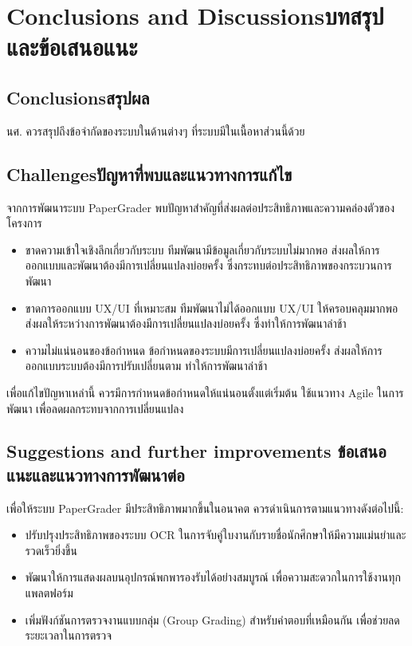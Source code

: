 \chapter{\ifenglish Conclusions and Discussions\else บทสรุปและข้อเสนอแนะ\fi}

\section{\ifenglish Conclusions\else สรุปผล\fi}

นศ. ควรสรุปถึงข้อจำกัดของระบบในด้านต่างๆ ที่ระบบมีในเนื้อหาส่วนนี้ด้วย

\section{\ifenglish Challenges\else ปัญหาที่พบและแนวทางการแก้ไข\fi}

จากการพัฒนาระบบ PaperGrader พบปัญหาสําคัญที่ส่งผลต่อประสิทธิภาพและความคล่องตัวของโครงการ
\begin{itemize}
  \item ขาดความเข้าใจเชิงลึกเกี่ยวกับระบบ ทีมพัฒนามีข้อมูลเกี่ยวกับระบบไม่มากพอ ส่งผลให้การออกแบบและพัฒนาต้องมีการเปลี่ยนแปลงบ่อยครั้ง ซึ่งกระทบต่อประสิทธิภาพของกระบวนการพัฒนา
  \item ขาดการออกแบบ UX/UI ที่เหมาะสม ทีมพัฒนาไม่ได้ออกแบบ UX/UI ให้ครอบคลุมมากพอ ส่งผลให้ระหว่างการพัฒนาต้องมีการเปลี่ยนแปลงบ่อยครั้ง ซึ่งทําให้การพัฒนาล่าช้า
  \item ความไม่แน่นอนของข้อกําหนด ข้อกําหนดของระบบมีการเปลี่ยนแปลงบ่อยครั้ง ส่งผลให้การออกแบบระบบต้องมีการปรับเปลี่ยนตาม ทําให้การพัฒนาล่าช้า
\end{itemize}
เพื่อแก้ไขปัญหาเหล่านี้ ควรมีการกําหนดข้อกําหนดให้แน่นอนตั้งแต่เริ่มต้น ใช้แนวทาง Agile ในการพัฒนา
เพื่อลดผลกระทบจากการเปลี่ยนแปลง

\section{\ifenglish%
Suggestions and further improvements
\else%
ข้อเสนอแนะและแนวทางการพัฒนาต่อ
\fi
}

เพื่อให้ระบบ PaperGrader มีประสิทธิภาพมากขึ้นในอนาคต ควรดําเนินการตามแนวทางดังต่อไปนี้:
\begin{itemize}
  \item ปรับปรุงประสิทธิภาพของระบบ OCR ในการจับคู่ใบงานกับรายชื่อนักศึกษาให้มีความแม่นยำและรวดเร็วยิ่งขึ้น
  \item พัฒนาให้การแสดงผลบนอุปกรณ์พกพารองรับได้อย่างสมบูรณ์ เพื่อความสะดวกในการใช้งานทุกแพลตฟอร์ม
  \item เพิ่มฟังก์ชันการตรวจงานแบบกลุ่ม (Group Grading) สำหรับคำตอบที่เหมือนกัน เพื่อช่วยลดระยะเวลาในการตรวจ
\end{itemize}